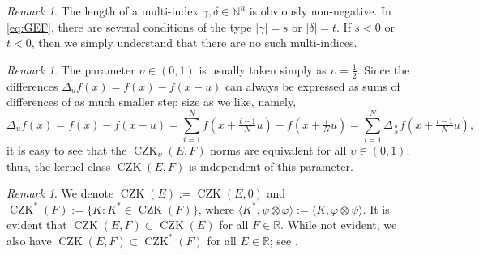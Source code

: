 \documentclass[11pt, reqno]{amsart}
\theoremstyle{definition}
\theoremstyle{remark}
\newtheorem{remark}[theorem]{Remark}
\numberwithin{equation}{section}
\newcommand{\N}{\mathbb N}
\newcommand{\R}{\mathbb R}
\newcommand{\pair}[2]{\langle #1, #2 \rangle}
\newcommand{\abs}[1]{|#1|}
\begin{document}
\begin{remark}\label{rem:GEF}
The length of a multi-index $\gamma,\delta\in\N^n$ is obviously non-negative.
In \eqref{eq:GEF}, there are several conditions of the type $\abs{\gamma}=s$ or $\abs{\delta}=t$. If $s<0$ or $t<0$, then we simply understand that there are no such multi-indices.
\end{remark}

\begin{remark}\label{rem:upsilon}
The parameter $\upsilon\in(0,1)$ is usually taken simply as $\upsilon=\frac12$. Since the differences $\Delta_u f(x)=f(x)-f(x-u)$ can always be expressed as sums of differences of as much smaller step size as we like, namely,
\begin{equation*}
  \Delta_u f(x)=f(x)-f(x-u)
  =\sum_{i=1}^N f(x+\tfrac{i-1}{N}u)-f(x+\tfrac{i}{N}u)
  =\sum_{i=1}^N \Delta_{\frac uN}f(x+\tfrac{i-1}{N}u),
\end{equation*}
it is easy to see that the $\operatorname{CZK}_{\upsilon}(E,F)$ norms are equivalent for all $\upsilon\in(0,1)$; thus, the kernel class $\operatorname{CZK}(E,F)$ is independent of this parameter.
\end{remark}

\begin{remark}\label{rem:CZE}
We denote $\operatorname{CZK}(E):=\operatorname{CZK}(E,0)$ and
$\operatorname{CZK}^*(F):=\{K:K^*\in\operatorname{CZK}(F)\}$, where $\pair{K^*}{\psi\otimes\varphi}:=\pair{K}{\varphi\otimes\psi}$.
It is evident that $\operatorname{CZK}(E,F)\subset\operatorname{CZK}(E)$ for all $F\in\R$.
While not evident, we also have $\operatorname{CZK}(E,F)\subset\operatorname{CZK}^*(F)$ for all $E\in\R$; see \cite[(6.17)]{BHYY:1c}.
\end{remark}
\end{document}
